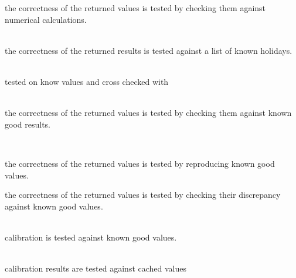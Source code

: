 \begin{DoxyRefList}
\label{test__test000078}%
%
the correctness of the returned values is tested by checking them against numerical calculations.  
\item[Class \doxylink{class_quant_lib_1_1_germany}{Quant\+Lib\+::Germany} ]\hfill \\
\label{test__test000172}%
%
the correctness of the returned results is tested against a list of known holidays.  
\item[Member \doxylink{namespace_quant_lib_a505d64f84a4000847f8f04ee60398665}{Quant\+Lib\+::get\+Covariance} (Data\+Iterator std\+Dev\+Begin, Data\+Iterator std\+Dev\+End, const \doxylink{class_quant_lib_1_1_matrix}{Matrix} \&corr, \doxylink{namespace_quant_lib_a372ac5c1a422a6b276fe0552d4d83f50}{Real} tolerance=1.\+0e-\/12)]\hfill \\
\label{test__test000049}%
%
tested on know values and cross checked with   
\item[Class \doxylink{class_quant_lib_1_1_halley}{Quant\+Lib\+::Halley} ]\hfill \\
\label{test__test000071}%
%
the correctness of the returned values is tested by checking them against known good results. 
\item[Class \doxylink{class_quant_lib_1_1_halton_rsg}{Quant\+Lib\+::Halton\+Rsg} ]\hfill \\
\label{test__test000058}%
%

\begin{DoxyItemize}
\item the correctness of the returned values is tested by reproducing known good values.
\item the correctness of the returned values is tested by checking their discrepancy against known good values. 
\end{DoxyItemize}
\item[Class \doxylink{class_quant_lib_1_1_heston_model}{Quant\+Lib\+::Heston\+Model} ]\hfill \\
\label{test__test000087}%
%
calibration is tested against known good values.  
\item[Class \doxylink{class_quant_lib_1_1_hull_white}{Quant\+Lib\+::Hull\+White} ]\hfill \\
\label{test__test000088}%
%
calibration results are tested against cached values 
\item[Class \doxylink{class_quant_lib_1_1_implied_term_structure}{Quant\+Lib\+::Implied\+Term\+Structure} ]\hfill \\
\label{test__test000165}%
%


\end{DoxyRefList}
